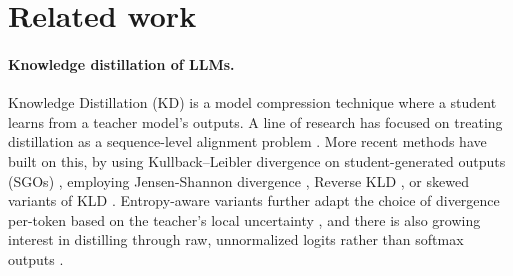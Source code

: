 \documentclass{article} %
\theoremstyle{definition}
\theoremstyle{remark}
\begin{document}






\newpage
\appendix
\section{Related work}
\paragraph{Knowledge distillation of LLMs.} Knowledge Distillation (KD) \cite{hinton2015distillingknowledgeneuralnetwork} is a model compression technique where a student learns from a teacher model's outputs. A line of research has focused on treating distillation as a sequence-level alignment problem \cite{kim2016sequencelevelknowledgedistillation}. More recent methods have built on this, by using Kullback–Leibler divergence on student-generated outputs (SGOs) \cite{lin2020autoregressiveknowledgedistillationimitation}, employing Jensen-Shannon divergence \cite{agarwal2024onpolicydistillationlanguagemodels}, Reverse KLD \cite{gu2024minillmknowledgedistillationlarge, wu2024rethinkingkullbackleiblerdivergenceknowledge}, or skewed variants of KLD \cite{ko2024distillmstreamlineddistillationlarge, ko2025distillm2contrastiveapproachboosts}. Entropy-aware variants further adapt the choice of divergence per-token based on the teacher's local uncertainty \cite{Jin2026EntropyAwareOD}, and there is also growing interest in distilling through raw, unnormalized logits rather than softmax outputs \cite{kim2026distillationlargelanguagemodels}.
\end{document}
